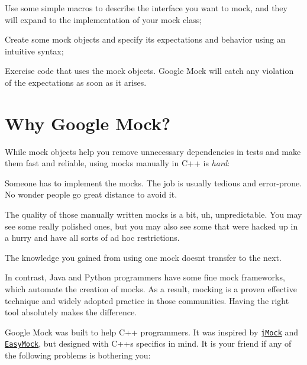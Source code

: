 \begin{DoxyEnumerate}
\item Use some simple macros to describe the interface you want to mock, and they will expand to the implementation of your mock class;
\end{DoxyEnumerate}
\begin{DoxyEnumerate}
\item Create some mock objects and specify its expectations and behavior using an intuitive syntax;
\end{DoxyEnumerate}
\begin{DoxyEnumerate}
\item Exercise code that uses the mock objects. Google Mock will catch any violation of the expectations as soon as it arises.
\end{DoxyEnumerate}

\section*{Why Google Mock?}

While mock objects help you remove unnecessary dependencies in tests and make them fast and reliable, using mocks manually in C++ is {\itshape hard}\+:


\begin{DoxyItemize}
\item Someone has to implement the mocks. The job is usually tedious and error-\/prone. No wonder people go great distance to avoid it.
\item The quality of those manually written mocks is a bit, uh, unpredictable. You may see some really polished ones, but you may also see some that were hacked up in a hurry and have all sorts of ad hoc restrictions.
\item The knowledge you gained from using one mock doesn\textquotesingle{}t transfer to the next.
\end{DoxyItemize}

In contrast, Java and Python programmers have some fine mock frameworks, which automate the creation of mocks. As a result, mocking is a proven effective technique and widely adopted practice in those communities. Having the right tool absolutely makes the difference.

Google Mock was built to help C++ programmers. It was inspired by \href{http://www.jmock.org/}{\tt j\+Mock} and \href{http://www.easymock.org/}{\tt Easy\+Mock}, but designed with C++\textquotesingle{}s specifics in mind. It is your friend if any of the following problems is bothering you\+:


